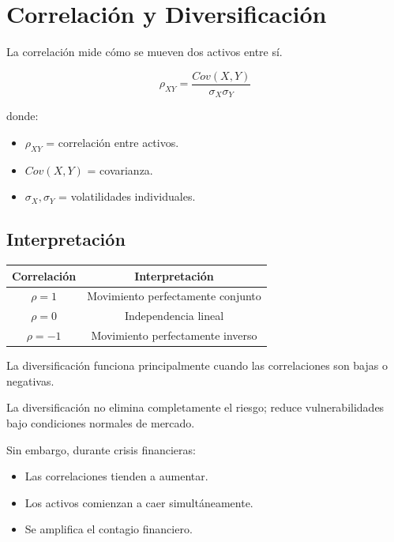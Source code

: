 \section{Correlación y Diversificación}

La correlación mide cómo se mueven dos activos entre sí.

\[
\rho_{XY} = \frac{Cov(X,Y)}{\sigma_X \sigma_Y}
\]

donde:

\begin{itemize}
    \item $\rho_{XY}$ = correlación entre activos.
    \item $Cov(X,Y)$ = covarianza.
    \item $\sigma_X, \sigma_Y$ = volatilidades individuales.
\end{itemize}

\subsection{Interpretación}

\begin{center}
\begin{tabular}{|c|c|}
\hline
Correlación & Interpretación \\
\hline
$\rho = 1$ & Movimiento perfectamente conjunto \\
$\rho = 0$ & Independencia lineal \\
$\rho = -1$ & Movimiento perfectamente inverso \\
\hline
\end{tabular}
\end{center}

La diversificación funciona principalmente cuando las correlaciones son bajas o negativas.

\begin{tcolorbox}[colback=blue!5,colframe=blue!60!black,title=Observación]
La diversificación no elimina completamente el riesgo; reduce vulnerabilidades bajo condiciones normales de mercado.
\end{tcolorbox}

Sin embargo, durante crisis financieras:

\begin{itemize}
    \item Las correlaciones tienden a aumentar.
    \item Los activos comienzan a caer simultáneamente.
    \item Se amplifica el contagio financiero.
\end{itemize}

